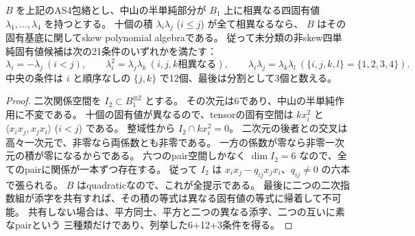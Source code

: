 \begin{theorem}[四単純固有値の二次非共鳴領域はskew]
\label{thm:cubic-simple-spectrum-skew}
$B$ を上記のAS4包絡とし、中山の半単純部分が $B_1$ 上に相異なる四固有値
$\lambda_1,\ldots,\lambda_4$ を持つとする。
十個の積 $\lambda_i\lambda_j$ ($i\le j$) が全て相異なるなら、
$B$ はその固有基底に関してskew polynomial algebraである。
従って未分類の非skew四単純固有値候補は次の21条件のいずれかを満たす：
\[
 \lambda_i=-\lambda_j\ (i<j),\qquad
 \lambda_i^2=\lambda_j\lambda_k\ (i,j,k\text{相異なる}),\qquad
 \lambda_i\lambda_j=\lambda_k\lambda_l\ (\{i,j,k,l\}=\{1,2,3,4\}).
\]
中央の条件は $i$ と順序なしの $\{j,k\}$ で12個、最後は分割として3個と数える。
\end{theorem}
\begin{proof}
二次関係空間を $I_2\subset B_1^{\otimes2}$ とする。
その次元は6であり、中山の半単純作用に不変である。
十個の固有値が異なるので、tensorの固有空間は
$kx_i^2$ と $\langle x_ix_j,x_jx_i\rangle$ ($i<j$) である。
整域性から $I_2\cap kx_i^2=0$。
二次元の後者との交叉は高々一次元で、非零なら両係数とも非零である。
一方の係数が零なら非零一次元の積が零になるからである。
六つのpair空間しかなく $\dim I_2=6$ なので、全てのpairに関係が一本ずつ存在する。
従って $I_2$ は $x_ix_j-q_{ij}x_jx_i$、$q_{ij}\ne0$ の六本で張られる。
$B$ はquadraticなので、これが全提示である。
最後に二つの二次指数組が添字を共有すれば、その積の等式は異なる固有値の等式に帰着して不可能。
共有しない場合は、平方同士、平方と二つの異なる添字、二つの互いに素なpairという
三種類だけであり、列挙した6+12+3条件を得る。
\end{proof}


